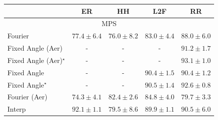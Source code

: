 \begin{tabular}{l|cccc|}
\toprule
            & ER & HH & L2F & RR \\
\midrule
\multicolumn{5}{c}{\rule{0pt}{8pt}MPS} \\
\midrule
Fourier & {\cellcolor[HTML]{FECB5F}} \color[HTML]{000000} $77.4\pm 6.4$ & {\cellcolor[HTML]{FED97C}} \color[HTML]{000000} $76.0\pm 8.2$ & {\cellcolor[HTML]{F3801C}} \color[HTML]{F1F1F1} $83.0\pm 4.4$ & {\cellcolor[HTML]{C04602}} \color[HTML]{F1F1F1} $88.0\pm 6.0$ \\
Fixed Angle (Aer) & {\cellcolor[HTML]{000000}} \color[HTML]{F1F1F1} {\cellcolor{white}} \color{black} - & {\cellcolor[HTML]{000000}} \color[HTML]{F1F1F1} {\cellcolor{white}} \color{black} - & {\cellcolor[HTML]{000000}} \color[HTML]{F1F1F1} {\cellcolor{white}} \color{black} - & {\cellcolor[HTML]{892F05}} \color[HTML]{F1F1F1} $91.2\pm 1.7$ \\
Fixed Angle (Aer)$^\star$ & {\cellcolor[HTML]{000000}} \color[HTML]{F1F1F1} {\cellcolor{white}} \color{black} - & {\cellcolor[HTML]{000000}} \color[HTML]{F1F1F1} {\cellcolor{white}} \color{black} - & {\cellcolor[HTML]{000000}} \color[HTML]{F1F1F1} {\cellcolor{white}} \color{black} - & {\cellcolor[HTML]{6B2606}} \color[HTML]{F1F1F1} $93.1\pm 1.0$ \\
Fixed Angle & {\cellcolor[HTML]{000000}} \color[HTML]{F1F1F1} {\cellcolor{white}} \color{black} - & {\cellcolor[HTML]{000000}} \color[HTML]{F1F1F1} {\cellcolor{white}} \color{black} - & {\cellcolor[HTML]{983404}} \color[HTML]{F1F1F1} $90.4\pm 1.5$ & {\cellcolor[HTML]{983404}} \color[HTML]{F1F1F1} $90.4\pm 1.2$ \\
Fixed Angle$^\star$ & {\cellcolor[HTML]{000000}} \color[HTML]{F1F1F1} {\cellcolor{white}} \color{black} - & {\cellcolor[HTML]{000000}} \color[HTML]{F1F1F1} {\cellcolor{white}} \color{black} - & {\cellcolor[HTML]{963304}} \color[HTML]{F1F1F1} $90.5\pm 1.4$ & {\cellcolor[HTML]{732905}} \color[HTML]{F1F1F1} $92.6\pm 0.8$ \\
Fourier (Aer) & {\cellcolor[HTML]{FEE89B}} \color[HTML]{000000} $74.3\pm 4.1$ & {\cellcolor[HTML]{F68820}} \color[HTML]{F1F1F1} $82.4\pm 2.6$ & {\cellcolor[HTML]{E56910}} \color[HTML]{F1F1F1} $84.8\pm 4.0$ & {\cellcolor[HTML]{FEAE3B}} \color[HTML]{000000} $79.7\pm 3.3$ \\
Interp & {\cellcolor[HTML]{7B2B05}} \color[HTML]{F1F1F1} $92.1\pm 1.1$ & {\cellcolor[HTML]{FEB13E}} \color[HTML]{000000} $79.5\pm 8.6$ & {\cellcolor[HTML]{A03704}} \color[HTML]{F1F1F1} $89.9\pm 1.1$ & {\cellcolor[HTML]{963304}} \color[HTML]{F1F1F1} $90.5\pm 6.0$ \\

\end{tabular}
